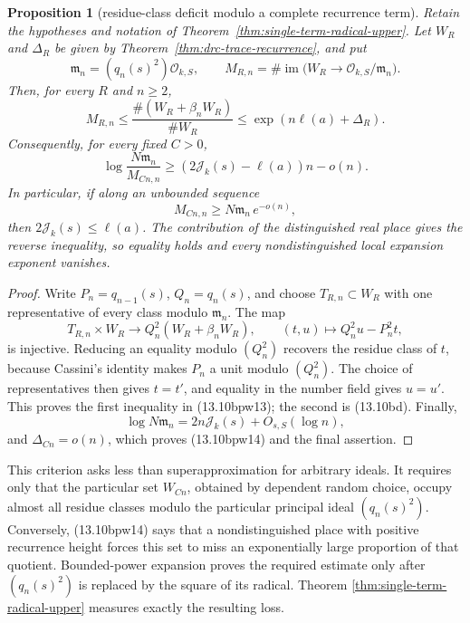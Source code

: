 \documentclass[11pt,reqno]{amsart}
\newtheorem{proposition}[theorem]{Proposition}
\theoremstyle{definition}
\theoremstyle{remark}
\newcommand{\cO}{\mathcal O}
\begin{document}
\begin{proposition}[residue-class deficit modulo a complete recurrence term]
\label{prop:full-depth-support-saturation}
Retain the hypotheses and notation of
Theorem~\ref{thm:single-term-radical-upper}.  Let \(W_R\) and
\(\Delta_R\) be given by
Theorem~\ref{thm:drc-trace-recurrence}, and put
\[
 \mathfrak m_n=(q_n(s)^2)\cO_{k,S},\qquad
 M_{R,n}=\#\operatorname{im}
 \bigl(W_R\longrightarrow\cO_{k,S}/\mathfrak m_n\bigr).
\tag{13.10bpw12}
\]
Then, for every \(R\) and \(n\ge2\),
\[
 M_{R,n}\le
 \frac{\#(W_R+\beta_nW_R)}{\#W_R}
 \le \exp(n\ell(a)+\Delta_R).
\tag{13.10bpw13}
\]
Consequently, for every fixed \(C>0\),
\[
 \log\frac{N\mathfrak m_n}{M_{Cn,n}}
 \ge (2\mathcal J_k(s)-\ell(a))n-o(n).
\tag{13.10bpw14}
\]
In particular, if along an unbounded sequence
\[
 M_{Cn,n}\ge N\mathfrak m_n\,e^{-o(n)},
\tag{13.10bpw15}
\]
then \(2\mathcal J_k(s)\le\ell(a)\).  The contribution of the
distinguished real place gives the reverse inequality, so equality holds and every
nondistinguished local expansion exponent vanishes.
\end{proposition}

\begin{proof}
Write \(P_n=q_{n-1}(s)\), \(Q_n=q_n(s)\), and choose
\(T_{R,n}\subset W_R\) with one representative of every class modulo
\(\mathfrak m_n\).  The map
\[
 T_{R,n}\times W_R\longrightarrow Q_n^2(W_R+\beta_nW_R),
 \qquad (t,u)\longmapsto Q_n^2u-P_n^2t,
\]
is injective.  Reducing an equality modulo \((Q_n^2)\) recovers the
residue class of \(t\), because Cassini's identity makes \(P_n\) a unit
modulo \((Q_n^2)\).  The choice of representatives then gives \(t=t'\),
and equality in the number field gives \(u=u'\).  This proves the first
inequality in (13.10bpw13); the second is (13.10bd).  Finally,
\[
 \log N\mathfrak m_n
 =2n\mathcal J_k(s)+O_{s,S}(\log n),
\]
and \(\Delta_{Cn}=o(n)\), which proves (13.10bpw14) and the final
assertion.
\end{proof}

This criterion asks less than superapproximation for arbitrary ideals.  It
requires only that the particular set \(W_{Cn}\), obtained by dependent
random choice, occupy almost all residue classes modulo the particular
principal ideal \((q_n(s)^2)\).  Conversely, (13.10bpw14) says that a
nondistinguished place with positive recurrence height forces this set to
miss an exponentially large proportion of that quotient.  Bounded-power
expansion proves the required estimate only after \((q_n(s)^2)\) is replaced
by the square of its radical.  Theorem
\ref{thm:single-term-radical-upper} measures exactly the resulting loss.
\end{document}
